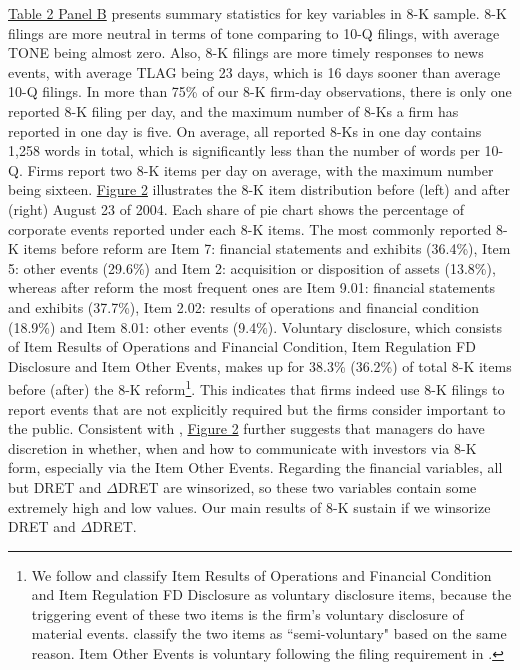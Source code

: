 \documentclass[a4paper]{article}
\begin{document}
\begin{spacing}{2}
\hyperref[T2PB]{Table 2 Panel B} presents summary statistics for key variables in 8-K sample. 8-K filings are more neutral in terms of tone comparing to 10-Q filings, with average TONE being almost zero. Also, 8-K filings are more timely responses to news events, with average TLAG being 23 days, which is 16 days sooner than average 10-Q filings. In more than 75\% of our 8-K firm-day observations, there is only one reported 8-K filing per day, and the maximum number of 8-Ks a firm has reported in one day is five. On average, all reported 8-Ks in one day contains 1,258 words in total, which is significantly less than the number of words per 10-Q. Firms report two 8-K items per day on average, with the maximum number being sixteen. \hyperref[fig2]{Figure 2} illustrates the 8-K item distribution before (left) and after (right) August 23 of 2004. Each share of pie chart shows the percentage of corporate events reported under each 8-K items. The most commonly reported 8-K items before reform are Item 7: financial statements and exhibits (36.4\%), Item 5: other events (29.6\%) and Item 2: acquisition or disposition of assets (13.8\%), whereas after reform the most frequent ones are Item 9.01: financial statements and exhibits (37.7\%), Item 2.02: results of operations and financial condition (18.9\%) and Item 8.01: other events (9.4\%). Voluntary disclosure, which consists of Item Results of Operations and Financial Condition, Item Regulation FD Disclosure and Item Other Events, makes up for 38.3\% (36.2\%) of total 8-K items before (after) the 8-K reform\footnote{We follow \citet{heMeasuringDisclosureUsing2020} and classify Item Results of Operations and Financial Condition and Item Regulation FD Disclosure as voluntary disclosure items, because the triggering event of these two items is the firm's voluntary disclosure of material events. \cite{lermanNewForm8K2010} classify the two items as ``semi-voluntary" based on the same reason. Item Other Events is voluntary following the filing requirement in \citet{secFinalRuleAdditional2004}. }. This indicates that firms indeed use 8-K filings to report events that are not explicitly required but the firms consider important to the public. Consistent with \citet{baoManagersDiscloseWithhold2019}, \hyperref[fig2]{Figure 2} further suggests that managers do have discretion in whether, when and how to communicate with investors via 8-K form, especially via the Item Other Events. Regarding the financial variables, all but DRET and $\Delta$DRET are winsorized, so these two variables contain some extremely high and low values. Our main results of 8-K sustain if we winsorize DRET and $\Delta$DRET.


\end{spacing}
\end{document}
